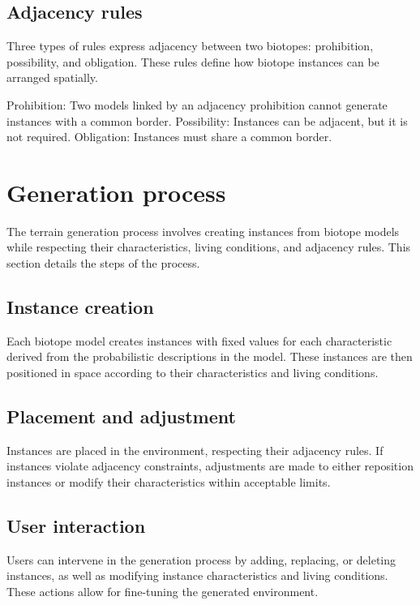 \subsection{Adjacency rules}
Three types of rules express adjacency between two biotopes: prohibition, possibility, and obligation. These rules define how biotope instances can be arranged spatially.

\begin{Itemize}
	\Item{} Prohibition: Two models linked by an adjacency prohibition cannot generate instances with a common border.
	\Item{} Possibility: Instances can be adjacent, but it is not required.
	\Item{} Obligation: Instances must share a common border.
\end{Itemize}

\section{Generation process}
\label{sec:influence-on-env-objects_generation-process}
The terrain generation process involves creating instances from biotope models while respecting their characteristics, living conditions, and adjacency rules. This section details the steps of the process.

\subsection{Instance creation}
Each biotope model creates instances with fixed values for each characteristic derived from the probabilistic descriptions in the model. These instances are then positioned in space according to their characteristics and living conditions.

\subsection{Placement and adjustment}
Instances are placed in the environment, respecting their adjacency rules. If instances violate adjacency constraints, adjustments are made to either reposition instances or modify their characteristics within acceptable limits.

\subsection{User interaction}
Users can intervene in the generation process by adding, replacing, or deleting instances, as well as modifying instance characteristics and living conditions. These actions allow for fine-tuning the generated environment.

